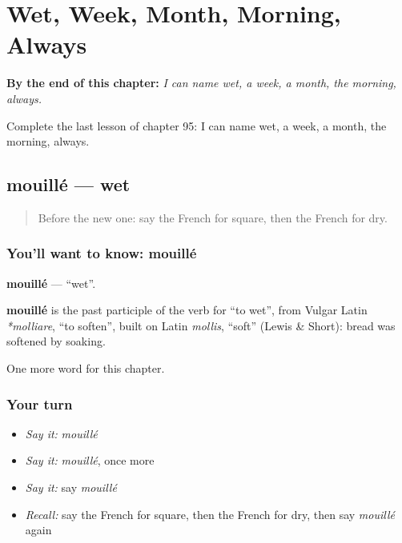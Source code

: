 
\chapter{Wet, Week, Month, Morning, Always}
\label{ch:fr-wet-week-month-morning-always}

\begin{chapteropening}
\textbf{By the end of this chapter:} \emph{I can name wet, a week, a month, the morning, always.}

Complete the last lesson of chapter 95: I can name wet, a week, a month, the morning, always.
\end{chapteropening}

\section[mouillé]{mouillé — wet}

\label{lesson:FR-C95-mouille}



\begin{quote}
Before the new one: say the French for square, then the French for dry.
\end{quote}

\subsection*{You'll want to know: mouillé}
\textbf{mouillé} — \textquotedblleft{}wet\textquotedblright{}.

\begin{cousinweb}
\textbf{mouillé} is the past participle of the verb for \textquotedblleft{}to wet\textquotedblright{}, from Vulgar Latin \emph{*molliare}, \textquotedblleft{}to soften\textquotedblright{}, built on Latin \emph{mollis}, \textquotedblleft{}soft\textquotedblright{} (Lewis \& Short): bread was softened by soaking.
\end{cousinweb}

\begin{grammarlens}[title={What you've built}]
One more word for this chapter.
\end{grammarlens}

\subsection*{Your turn}
\begin{itemize}
\raggedright
  \item \emph{Say it:} \emph{mouillé}
  \item \emph{Say it:} \emph{mouillé}, once more
  \item \emph{Say it:} say \emph{mouillé}
  \item \emph{Recall:} say the French for square, then the French for dry, then say \emph{mouillé} again
\end{itemize}

